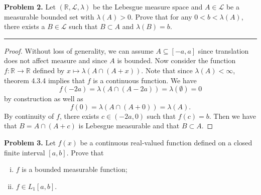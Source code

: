 \documentclass[leqno]{article}
\theoremstyle{nonumberplain}
\newtheorem{proof}{Proof}
\newcommand{\R}{\mathbb{R}}
\newcommand{\Leb}{\mathcal{L}}
\begin{document}
\pagebreak



\noindent\textbf{Problem 2.} \quad
Let $(\R,\Leb, \lambda)$ be the Lebesgue measure space and $A\in \Leb$ be a measurable bounded set with $\lambda(A)>0$. Prove that for any $0<b<\lambda(A)$, there exists a $B \in \Leb$ such that $B\subset A$ and $\lambda(B)=b$.


\noindent\rule[0.5ex]{\linewidth}{1pt}


\begin{proof}
Without loss of generality, we can assume $A\subseteq [-a,a]$ since translation does not affect measure and since $A$ is bounded.  Now consider the function $f\colon \R \to \R$ defined by $x\mapsto \lambda(A\cap (A+x))$.  Note that since $\lambda(A)<\infty$, theorem 4.3.4 implies that $f$ is a continuous function.  We have 
\[
f(-2a)=\lambda(A\cap (A-2a))=\lambda(\emptyset)=0
\]
by construction as well as
\[
f(0)=\lambda(A\cap (A+0))=\lambda(A).
\]
By continuity of $f$, there exists $c\in (-2a,0)$ such that $f(c)=b$.  Then we have that $B=A\cap(A+c)$ is Lebesgue measurable and that $B\subset A$.
\end{proof}


\pagebreak


\noindent\textbf{Problem 3.} \quad
Let $f(x)$ be a continuous real-valued function defined on a closed finite interval $[a,b]$. Prove that
\begin{enumerate}[(i)]
\item $f$ is a bounded measurable function;
\item $f\in L_1[a,b]$.
\end{enumerate}
\end{document}

